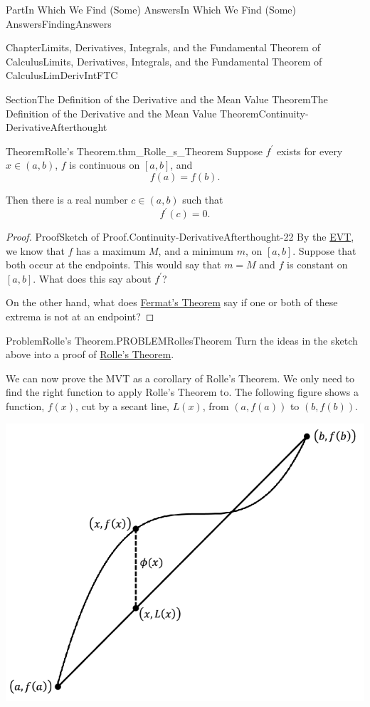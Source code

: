 \documentclass[oneside,10pt,]{book}
\numberwithin{equation}{part}
\begin{document}
\begin{partptx}{Part}{In Which We Find (Some) Answers}{}{In Which We Find (Some) Answers}{}{}{FindingAnswers}
\begin{chapterptx}{Chapter}{Limits, Derivatives, Integrals, and the Fundamental Theorem of Calculus}{}{Limits, Derivatives, Integrals, and the Fundamental Theorem of Calculus}{}{}{LimDerivIntFTC}
\begin{sectionptx}{Section}{The Definition of  the Derivative and the Mean Value Theorem}{}{The Definition of  the Derivative and the Mean Value Theorem}{}{}{Continuity-DerivativeAfterthought}
\begin{theorem}{Theorem}{Rolle's Theorem.}{}{thm_Rolle_s_Theorem}
%
Suppose \(f^\prime\) exists for every \(x\in(a,b)\), \(f\) is continuous on \([a,b]\), and%
\begin{equation*}
f(a)=f(b) \text{.}
\end{equation*}
%
\par
Then there is a real number \(c\in(a,b)\) such that%
\begin{equation*}
f^\prime(c)=0 \text{.}
\end{equation*}
%
\end{theorem}
\begin{proof}{Proof}{Sketch of Proof.}{Continuity-DerivativeAfterthought-22}
By the \hyperref[thm_EVT]{EVT}, we know that \(f\) has a maximum \(M\), and a minimum \(m\), on \([a,b]\).  Suppose that both occur at the endpoints.  This would say that \(m=M\) and \(f\) is constant on \([a,b]\).  What does this say about \(f^\prime\)?%
\par
On the other hand, what does \hyperref[thm_FermatsTheorem]{Fermat's Theorem} say if one or both of these extrema is not at an endpoint?%
\end{proof}
\begin{problem}{Problem}{Rolle's Theorem.}{PROBLEMRollesTheorem}%
Turn the ideas in the sketch above into a proof of \hyperref[thm_Rolle_s_Theorem]{Rolle's Theorem}.%
\end{problem}
We can now prove the MVT as a corollary of Rolle's Theorem.  We only need to find the right function to apply Rolle's Theorem to.  The following figure shows a function, \(f(x)\), cut by a secant line, \(L(x)\), from \((a, f(a))\) to \((b,f(b))\).%
\begin{image}{0.3}{0.4}{0.3}{}%
\includegraphics[width=\linewidth]{external/images/MVT.png}

\end{image}
\end{sectionptx}
\end{chapterptx}
\end{partptx}
\end{document}
